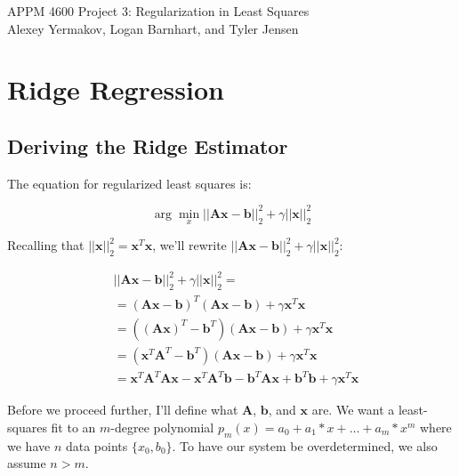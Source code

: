 \documentclass{article}
\newcommand{\x}{\mathbf{x}}
\newcommand{\A}{\mathbf{A}}
\newcommand{\B}{\mathbf{b}} %
\begin{document}
APPM 4600 Project 3: Regularization in Least Squares\\
Alexey Yermakov, Logan Barnhart, and Tyler Jensen

\section{Ridge Regression}
\subsection{Deriving the Ridge Estimator}

The equation for regularized least squares is:

\begin{equation} \label{eqn:rls}
    \arg \min_{x} ||\A\x-\B||_{2}^{2} + \gamma||\x||_{2}^{2}
\end{equation}

Recalling that $||\mathbf{x}||_{2}^{2}=\mathbf{x}^T \mathbf{x}$, we'll rewrite $||\mathbf{Ax}-\mathbf{b}||_{2}^{2} + \gamma||\mathbf{x}||_{2}^{2}$:

\begin{equation*}
\begin{split}
    & ||\A\x-\B||_{2}^{2} + \gamma||\x||_{2}^{2} =\\
    & =  (\A\x - \B)^T (\A\x - \B) + \gamma \x^T \x \\ 
    & =  ((\A\x)^T - \B^T) (\A\x - \B) + \gamma \x^T \x \\ 
    & =  (\x^T\A^T - \B^T) (\A\x - \B) + \gamma \x^T \x \\ 
    & = \x^T \A^T \A\x - \x^T \A^T \B - \B^T \A\x + \B^T \B + \gamma \x^T \x
\end{split}
\end{equation*}

Before we proceed further, I'll define what $\A$, $\B$, and $\x$ are. We want a least-squares fit to an $m$-degree polynomial $p_m(x)=a_0+a_1*x+\ldots+a_m*x^m$ where we have $n$ data points $\{x_0,b_0\}$. To have our system be overdetermined, we also assume $n > m$.
\end{document}
